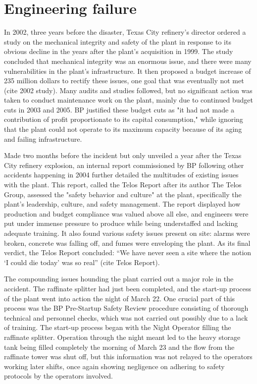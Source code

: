 \documentclass[12pt]{article}
\begin{document}
	\section*{Engineering failure}
	In 2002, three years before the disaster, Texas City refinery's director ordered a study on the mechanical integrity and safety of the plant in response to its obvious decline in the years after the plant's acquisition in 1999. The study concluded that mechanical integrity was an enormous issue, and there were many vulnerabilities in the plant's infrastructure. It then proposed a budget increase of 235 million dollars to rectify these issues, one goal that was eventually not met (cite 2002 study). Many audits and studies followed, but no significant action was taken to conduct maintenance work on the plant, mainly due to continued budget cuts in 2003 and 2005. BP justified these budget cuts as "it had not made a contribution of profit proportionate to its capital
	consumption," while ignoring that the plant could not operate to its maximum capacity because of its aging and failing infrastructure.
	
	Made two months before the incident but only unveiled a year after the Texas City refinery explosion, an internal report commissioned by BP following other accidents happening in 2004 further detailed the multitudes of existing issues with the plant. This report, called the Telos Report after its author The Telos Group, assessed the "safety behavior and culture" at the plant, specifically the plant's leadership, culture, and safety management. The report displayed how production and budget compliance was valued above all else, and engineers were put under immense pressure to produce while being understaffed and lacking adequate training. It also found various safety issues present on site: alarms were broken, concrete was falling off, and fumes were enveloping the plant. As its final verdict, the Telos Report concluded: “We have never seen a site where the notion ‘I could die today’ was so real” (cite Telos Report).
	
	 The compounding issues hounding the plant carried out a major role in the accident. The raffinate splitter had just been completed, and the start-up process of the plant went into action the night of March 22. One crucial part of this process was the BP Pre-Startup Safety Review procedure consisting of thorough technical and personnel checks, which was not carried out possibly due to a lack of training. The start-up process began with the Night Operator filling the raffinate splitter. Operation through the night meant led to the heavy storage tank being filled completely the morning of March 23 and the flow from the raffinate tower was shut off, but this information was not relayed to the operators working later shifts, once again showing negligence on adhering to safety protocols by the operators involved. 
	 
\end{document}
